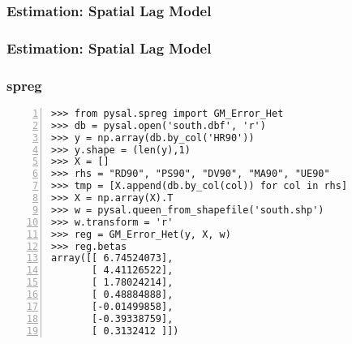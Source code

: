 \documentclass{beamer}
\begin{document}
\begin{frame}\frametitle{Estimation: Spatial Lag Model}

\begin{center}
     \begin{figure}
      \end{figure}      
\end{center}

\end{frame}

\begin{frame}\frametitle{Estimation: Spatial Lag Model}

\begin{center}
     \begin{figure}
      \end{figure}      
\end{center}

\end{frame}



\begin{frame}[fragile]
  \frametitle{spreg}
  \begin{footnotesize}
  \begin{Verbatim}[numbers=left]
>>> from pysal.spreg import GM_Error_Het
>>> db = pysal.open('south.dbf', 'r')
>>> y = np.array(db.by_col('HR90'))
>>> y.shape = (len(y),1)
>>> X = []
>>> rhs = "RD90", "PS90", "DV90", "MA90", "UE90"
>>> tmp = [X.append(db.by_col(col)) for col in rhs]
>>> X = np.array(X).T
>>> w = pysal.queen_from_shapefile('south.shp')
>>> w.transform = 'r'
>>> reg = GM_Error_Het(y, X, w)
>>> reg.betas
array([[ 6.74524073],
       [ 4.41126522],
       [ 1.78024214],
       [ 0.48884888],
       [-0.01499858],
       [-0.39338759],
       [ 0.3132412 ]])
\end{Verbatim} 
\end{footnotesize}
\end{frame}


\begin{frame}
  
\begin{center}
     \begin{figure}
      \end{figure}      
\end{center}
\end{frame}
\end{document}
